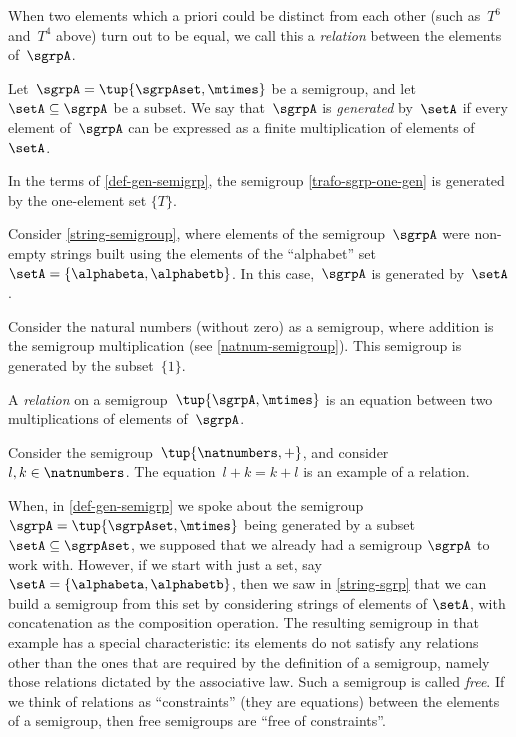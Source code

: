 When two elements which a priori could be distinct from each other (such as~$T^6$ and~$T^4$ above) turn out to be equal, we call this a \emph{relation} between the elements of~$\sgrpA$.

\begin{definition}\label{def-gen-semigrp}
Let~$\sgrpA = \tup{\sgrpAset, \mtimes}$ be a semigroup, and let~$\setA \subseteq \sgrpA$ be a subset.
We say that~$\sgrpA$ is \emph{generated} by~$\setA$ if every element of~$\sgrpA$ can be expressed as a finite multiplication of elements of~$\setA$.
\end{definition}

\begin{remark}
In the terms of \cref{def-gen-semigrp}, the semigroup \cref{trafo-sgrp-one-gen} is generated by the one-element set $\{ T \}$.
\end{remark}

\begin{example}
Consider \cref{string-semigroup}, where elements of the semigroup~$\sgrpA$ were non-empty strings built using the elements of the ``alphabet'' set~$\setA = \{ \alphabeta, \alphabetb\}$.
In this case,~$\sgrpA$ is generated by~$\setA$.
\end{example}


\begin{example}
Consider the natural numbers (without zero) as a semigroup, where addition is the semigroup multiplication (see \cref{natnum-semigroup}). This semigroup is generated by the subset~$\{1 \}$.
\end{example}

\begin{definition}
A \emph{relation} on a semigroup~$\tup{\sgrpA, \mtimes}$ is an equation between two multiplications of elements of~$\sgrpA$.
\end{definition}

\begin{example}
Consider the semigroup~$\tup{\natnumbers, +}$, and consider~$l, k \in \natnumbers$. The equation~$l + k = k + l$ is an example of  a relation.
\end{example}

When, in \cref{def-gen-semigrp} we spoke about the semigroup $\sgrpA = \tup{\sgrpAset, \mtimes}$  being generated by a subset $\setA \subseteq \sgrpAset$, we supposed that we already had a semigroup $\sgrpA$ to work with. However, if we start with just a set, say $\setA = \{ \alphabeta, \alphabetb\}$, then we saw in \cref{string-sgrp} that we can build a semigroup from this set by considering strings of elements of $\setA$, with concatenation as the composition operation. The resulting semigroup in that example has a special characteristic: its elements do not satisfy any relations other than the ones that are required by the definition of a semigroup, namely those relations dictated by the associative law. Such a semigroup is called \emph{free}. If we think of relations as ``constraints'' (they are equations) between the elements of a semigroup, then free semigroups are ``free of constraints''.

